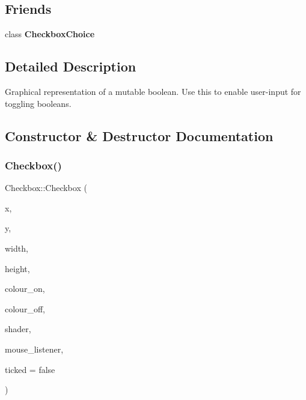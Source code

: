 \subsection*{Friends}
\begin{DoxyCompactItemize}
\item 
\mbox{\label{class_checkbox_a4b620fd2be6bc41e03130fc79d3ee6a3}} 
class {\bfseries Checkbox\+Choice}
\end{DoxyCompactItemize}


\subsection{Detailed Description}
Graphical representation of a mutable boolean. Use this to enable user-\/input for toggling booleans. 

\subsection{Constructor \& Destructor Documentation}
\mbox{\label{class_checkbox_aef583c2ed2cc9004aec3330f9b9d02a3}} 
\subsubsection{\texorpdfstring{Checkbox()}{Checkbox()}}
{\footnotesize\ttfamily Checkbox\+::\+Checkbox (\begin{DoxyParamCaption}\item[{float}]{x,  }\item[{float}]{y,  }\item[{float}]{width,  }\item[{float}]{height,  }\item[{\mbox{\hyperlink{class_vector4}{Vector4F}}}]{colour\+\_\+on,  }\item[{\mbox{\hyperlink{class_vector4}{Vector4F}}}]{colour\+\_\+off,  }\item[{\mbox{\hyperlink{class_shader}{Shader}} \&}]{shader,  }\item[{\mbox{\hyperlink{class_mouse_listener}{Mouse\+Listener}} \&}]{mouse\+\_\+listener,  }\item[{bool}]{ticked = {\ttfamily false} }\end{DoxyParamCaption})}

